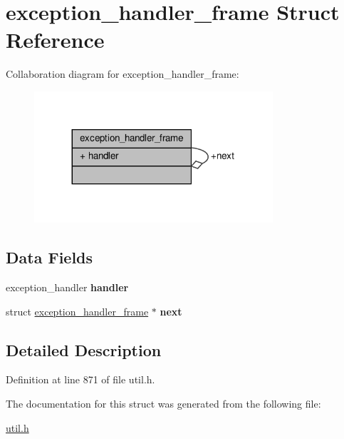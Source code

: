 \hypertarget{structexception__handler__frame}{}\section{exception\+\_\+handler\+\_\+frame Struct Reference}
\label{structexception__handler__frame}


Collaboration diagram for exception\+\_\+handler\+\_\+frame\+:
\nopagebreak
\begin{figure}[H]
\begin{center}
\leavevmode
\includegraphics[width=251pt]{structexception__handler__frame__coll__graph}
\end{center}
\end{figure}
\subsection*{Data Fields}
\begin{DoxyCompactItemize}
\item 
\mbox{\label{structexception__handler__frame_a9df815cc8cec8aace242043b89fb44e8}} 
exception\+\_\+handler {\bfseries handler}
\item 
\mbox{\label{structexception__handler__frame_a407cf31d00d01b49b1774dea464c29cf}} 
struct \hyperlink{structexception__handler__frame}{exception\+\_\+handler\+\_\+frame} $\ast$ {\bfseries next}
\end{DoxyCompactItemize}


\subsection{Detailed Description}


Definition at line 871 of file util.\+h.



The documentation for this struct was generated from the following file\+:\begin{DoxyCompactItemize}
\item 
\hyperlink{util_8h}{util.\+h}\end{DoxyCompactItemize}

